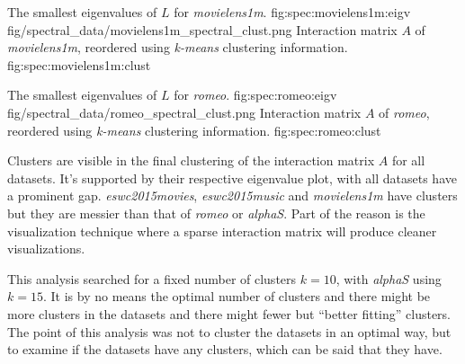 {The smallest eigenvalues of $L$ for \textit{movielens1m}.}
{fig:spec:movielens1m:eigv}
{fig/spectral_data/movielens1m_spectral_clust.png}
{Interaction matrix $A$ of \textit{movielens1m}, reordered using \textit{k-means} clustering information.}
{fig:spec:movielens1m:clust}

\FloatBarrier

{The smallest eigenvalues of $L$ for \textit{romeo}.}
{fig:spec:romeo:eigv}
{fig/spectral_data/romeo_spectral_clust.png}
{Interaction matrix $A$ of \textit{romeo}, reordered using \textit{k-means} clustering information.}
{fig:spec:romeo:clust}

Clusters are visible in the final clustering of the interaction matrix $A$ for all datasets. It's supported by their respective eigenvalue plot, with all datasets have a prominent gap. \textit{eswc2015movies}, \textit{eswc2015music} and \textit{movielens1m} have clusters but they are messier than that of \textit{romeo} or \textit{alphaS}. Part of the reason is the visualization technique where a sparse interaction matrix will produce cleaner visualizations.

This analysis searched for a fixed number of clusters $k = 10$, with \textit{alphaS} using $k = 15$. It is by no means the optimal number of clusters and there might be more clusters in the datasets and there might fewer but ``better fitting'' clusters. The point of this analysis was not to cluster the datasets in an optimal way, but to examine if the datasets have any clusters, which can be said that they have.

